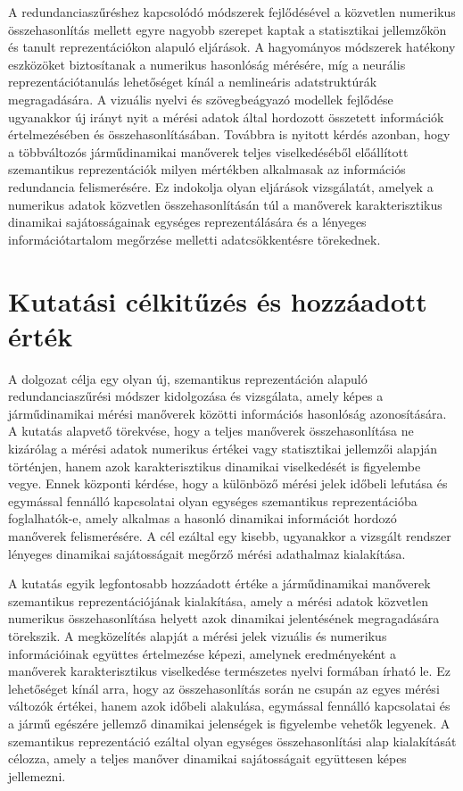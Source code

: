 \documentclass[12pt,a4paper,onehalfspacing, oneside]{book} %
\begin{document}
A redundanciaszűréshez kapcsolódó módszerek fejlődésével a közvetlen numerikus összehasonlítás mellett egyre nagyobb szerepet kaptak a statisztikai jellemzőkön és tanult reprezentációkon alapuló eljárások. A hagyományos módszerek hatékony eszközöket biztosítanak a numerikus hasonlóság mérésére, míg a neurális reprezentációtanulás lehetőséget kínál a nemlineáris adatstruktúrák megragadására. A vizuális nyelvi és szövegbeágyazó modellek fejlődése ugyanakkor új irányt nyit a mérési adatok által hordozott összetett információk értelmezésében és összehasonlításában. Továbbra is nyitott kérdés azonban, hogy a többváltozós járműdinamikai manőverek teljes viselkedéséből előállított szemantikus reprezentációk milyen mértékben alkalmasak az információs redundancia felismerésére. Ez indokolja olyan eljárások vizsgálatát, amelyek a numerikus adatok közvetlen összehasonlításán túl a manőverek karakterisztikus dinamikai sajátosságainak egységes reprezentálására és a lényeges információtartalom megőrzése melletti adatcsökkentésre törekednek.

\section{Kutatási célkitűzés és hozzáadott érték}
A dolgozat célja egy olyan új, szemantikus reprezentáción alapuló redundanciaszűrési módszer kidolgozása és vizsgálata, amely képes a járműdinamikai mérési manőverek közötti információs hasonlóság azonosítására. A kutatás alapvető törekvése, hogy a teljes manőverek összehasonlítása ne kizárólag a mérési adatok numerikus értékei vagy statisztikai jellemzői alapján történjen, hanem azok karakterisztikus dinamikai viselkedését is figyelembe vegye. Ennek központi kérdése, hogy a különböző mérési jelek időbeli lefutása és egymással fennálló kapcsolatai olyan egységes szemantikus reprezentációba foglalhatók-e, amely alkalmas a hasonló dinamikai információt hordozó manőverek felismerésére. A cél ezáltal egy kisebb, ugyanakkor a vizsgált rendszer lényeges dinamikai sajátosságait megőrző mérési adathalmaz kialakítása.

A kutatás egyik legfontosabb hozzáadott értéke a járműdinamikai manőverek szemantikus reprezentációjának kialakítása, amely a mérési adatok közvetlen numerikus összehasonlítása helyett azok dinamikai jelentésének megragadására törekszik. A megközelítés alapját a mérési jelek vizuális és numerikus információinak együttes értelmezése képezi, amelynek eredményeként a manőverek karakterisztikus viselkedése természetes nyelvi formában írható le. Ez lehetőséget kínál arra, hogy az összehasonlítás során ne csupán az egyes mérési változók értékei, hanem azok időbeli alakulása, egymással fennálló kapcsolatai és a jármű egészére jellemző dinamikai jelenségek is figyelembe vehetők legyenek. A szemantikus reprezentáció ezáltal olyan egységes összehasonlítási alap kialakítását célozza, amely a teljes manőver dinamikai sajátosságait együttesen képes jellemezni.
\end{document}
